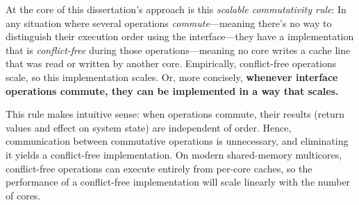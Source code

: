 

At the core of this dissertation's approach is this \emph{scalable
  commutativity
  rule}: In any situation where several operations
\emph{commute}---meaning there's no way to distinguish their execution
order using the interface---they have a implementation that is
\emph{conflict-free} during those operations---meaning no core
writes a cache line that was read or written by another core.
%
Empirically, conflict-free operations scale, so this implementation
scales.
%
Or, more concisely, \textbf{whenever interface operations commute,
  they can be implemented in a way that scales.}

This rule makes intuitive sense: when operations commute, their
results (return values and effect on system state) are independent of
order.  Hence, communication between commutative operations is
unnecessary, and eliminating it yields a conflict-free implementation.
%
On modern shared-memory multicores, conflict-free operations can
execute entirely from per-core caches, so the performance of
a conflict-free implementation will scale linearly with the number of
cores.

